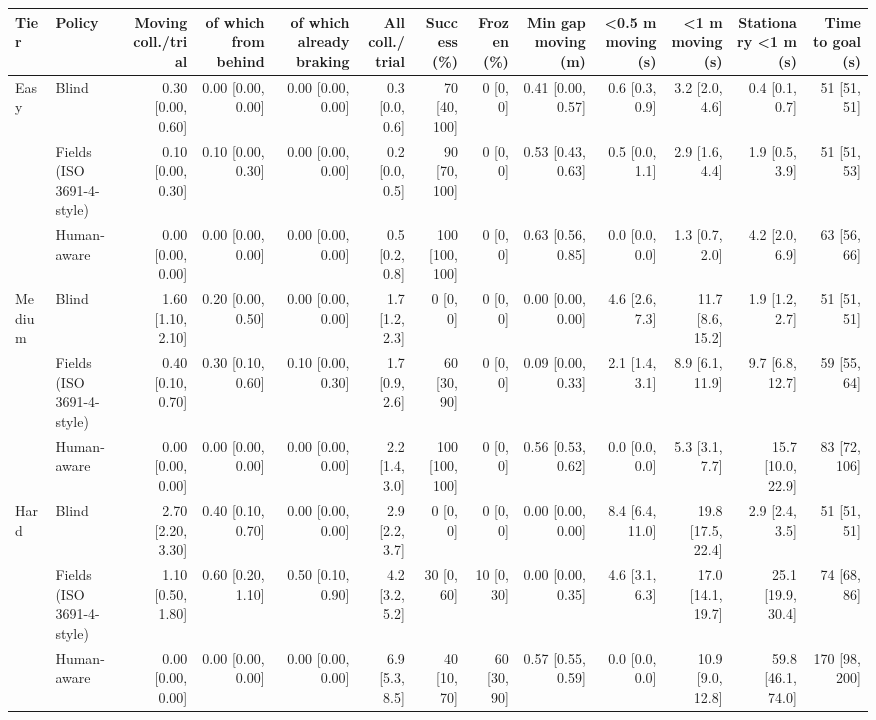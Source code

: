 \begin{tabular}{llrrrrrrrrrrr}
\toprule
Tier & Policy & Moving coll./trial & of which from behind & of which already braking & All coll./trial & Success (\%) & Frozen (\%) & Min gap moving (m) & <0.5 m moving (s) & <1 m moving (s) & Stationary <1 m (s) & Time to goal (s) \\
\midrule
Easy & Blind & 0.30 [0.00, 0.60] & 0.00 [0.00, 0.00] & 0.00 [0.00, 0.00] & 0.3 [0.0, 0.6] & 70 [40, 100] & 0 [0, 0] & 0.41 [0.00, 0.57] & 0.6 [0.3, 0.9] & 3.2 [2.0, 4.6] & 0.4 [0.1, 0.7] & 51 [51, 51] \\
 & Fields (ISO 3691-4-style) & 0.10 [0.00, 0.30] & 0.10 [0.00, 0.30] & 0.00 [0.00, 0.00] & 0.2 [0.0, 0.5] & 90 [70, 100] & 0 [0, 0] & 0.53 [0.43, 0.63] & 0.5 [0.0, 1.1] & 2.9 [1.6, 4.4] & 1.9 [0.5, 3.9] & 51 [51, 53] \\
 & Human-aware & 0.00 [0.00, 0.00] & 0.00 [0.00, 0.00] & 0.00 [0.00, 0.00] & 0.5 [0.2, 0.8] & 100 [100, 100] & 0 [0, 0] & 0.63 [0.56, 0.85] & 0.0 [0.0, 0.0] & 1.3 [0.7, 2.0] & 4.2 [2.0, 6.9] & 63 [56, 66] \\
\midrule
Medium & Blind & 1.60 [1.10, 2.10] & 0.20 [0.00, 0.50] & 0.00 [0.00, 0.00] & 1.7 [1.2, 2.3] & 0 [0, 0] & 0 [0, 0] & 0.00 [0.00, 0.00] & 4.6 [2.6, 7.3] & 11.7 [8.6, 15.2] & 1.9 [1.2, 2.7] & 51 [51, 51] \\
 & Fields (ISO 3691-4-style) & 0.40 [0.10, 0.70] & 0.30 [0.10, 0.60] & 0.10 [0.00, 0.30] & 1.7 [0.9, 2.6] & 60 [30, 90] & 0 [0, 0] & 0.09 [0.00, 0.33] & 2.1 [1.4, 3.1] & 8.9 [6.1, 11.9] & 9.7 [6.8, 12.7] & 59 [55, 64] \\
 & Human-aware & 0.00 [0.00, 0.00] & 0.00 [0.00, 0.00] & 0.00 [0.00, 0.00] & 2.2 [1.4, 3.0] & 100 [100, 100] & 0 [0, 0] & 0.56 [0.53, 0.62] & 0.0 [0.0, 0.0] & 5.3 [3.1, 7.7] & 15.7 [10.0, 22.9] & 83 [72, 106] \\
\midrule
Hard & Blind & 2.70 [2.20, 3.30] & 0.40 [0.10, 0.70] & 0.00 [0.00, 0.00] & 2.9 [2.2, 3.7] & 0 [0, 0] & 0 [0, 0] & 0.00 [0.00, 0.00] & 8.4 [6.4, 11.0] & 19.8 [17.5, 22.4] & 2.9 [2.4, 3.5] & 51 [51, 51] \\
 & Fields (ISO 3691-4-style) & 1.10 [0.50, 1.80] & 0.60 [0.20, 1.10] & 0.50 [0.10, 0.90] & 4.2 [3.2, 5.2] & 30 [0, 60] & 10 [0, 30] & 0.00 [0.00, 0.35] & 4.6 [3.1, 6.3] & 17.0 [14.1, 19.7] & 25.1 [19.9, 30.4] & 74 [68, 86] \\
 & Human-aware & 0.00 [0.00, 0.00] & 0.00 [0.00, 0.00] & 0.00 [0.00, 0.00] & 6.9 [5.3, 8.5] & 40 [10, 70] & 60 [30, 90] & 0.57 [0.55, 0.59] & 0.0 [0.0, 0.0] & 10.9 [9.0, 12.8] & 59.8 [46.1, 74.0] & 170 [98, 200] \\
\bottomrule
\end{tabular}
